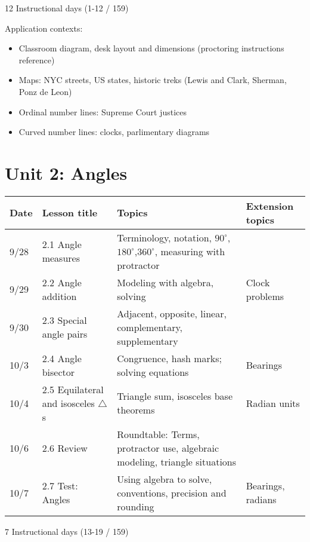 12 Instructional days (1-12 / 159)

Application contexts: 
\begin{itemize}
  \item Classroom diagram, desk layout and dimensions (proctoring instructions reference)
  \item Maps: NYC streets, US states, historic treks (Lewis and Clark, Sherman, Ponz de Leon)
  \item Ordinal number lines: Supreme Court justices
  \item Curved number lines: clocks, parlimentary diagrams
\end{itemize}


\newpage
\section*{Unit 2: Angles}
\begin{tabular}{|p{0.9cm}|p{4cm}|p{7cm}|p{5cm}|}
  \hline
  Date & Lesson title & Topics  & Extension topics \\
  \hline
  9/28 & 2.1 Angle measures & Terminology, notation, $90^\circ$, $180^\circ$,$360^\circ$, measuring with protractor &  \\
  \hline
  9/29 & 2.2 Angle addition & Modeling with algebra, solving & Clock problems \\
  \hline
  9/30 & 2.3 Special angle pairs & Adjacent, opposite, linear, complementary, supplementary &  \\
  \hline
  10/3 & 2.4 Angle bisector & Congruence, hash marks; solving equations & Bearings \\
  \hline
  10/4 & 2.5 Equilateral and isosceles $\triangle$s & Triangle sum, isosceles base theorems & Radian units \\
  \hline
  10/6 & 2.6 Review & Roundtable: Terms, protractor use, algebraic modeling, triangle situations & \\
  \hline
  10/7 & 2.7 Test: Angles & Using algebra to solve, conventions, precision and rounding & Bearings, radians \\
  \hline

\end{tabular} \par \vspace*{0.3cm}
7 Instructional days (13-19 / 159)

